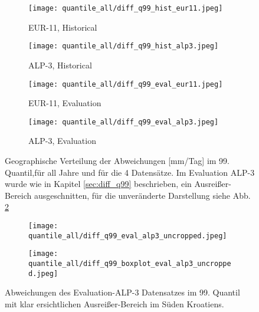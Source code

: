 \begin{figure}
	\begin{subfigure}{0.49\textwidth}
		\texttt{[image: quantile\_all/diff\_q99\_hist\_eur11.jpeg]}
		\caption{EUR-11, Historical}
	\end{subfigure}
	\begin{subfigure}{0.49\textwidth}
		\texttt{[image: quantile\_all/diff\_q99\_hist\_alp3.jpeg]}
		\caption{ALP-3, Historical}
	\end{subfigure}
	\begin{subfigure}{0.49\textwidth}
		\texttt{[image: quantile\_all/diff\_q99\_eval\_eur11.jpeg]}
		\caption{EUR-11, Evaluation}
	\end{subfigure}
	\begin{subfigure}{0.49\textwidth}
		\texttt{[image: quantile\_all/diff\_q99\_eval\_alp3.jpeg]}
		\caption{ALP-3, Evaluation}
	\end{subfigure}
	\caption{Geographische Verteilung der Abweichungen [mm/Tag] im 99. Quantil,für all Jahre und für die 4 Datensätze. Im Evaluation ALP-3 wurde wie in Kapitel \ref{sec:diff_q99} beschrieben, ein Ausreißer-Bereich ausgeschnitten, für die unveränderte Darstellung siehe Abb. \ref{fig:quantile_eval_alp3}}
	\label{fig:quantile_all}
\end{figure}
\begin{figure}
	\begin{subfigure}{0.49\textwidth}
		\texttt{[image: quantile\_all/diff\_q99\_eval\_alp3\_uncropped.jpeg]}
	\end{subfigure}
	\begin{subfigure}{0.49\textwidth}
		\texttt{[image: quantile\_all/diff\_q99\_boxplot\_eval\_alp3\_uncropped.jpeg]}
	\end{subfigure}
	\caption{Abweichungen des Evaluation-ALP-3 Datensatzes im 99. Quantil mit klar ersichtlichen Ausreißer-Bereich im Süden Kroatiens.}
	\label{fig:quantile_eval_alp3}
\end{figure}

